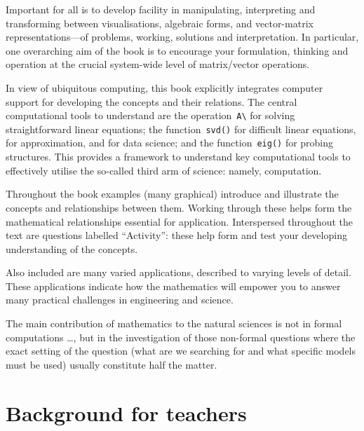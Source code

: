 Important for all is to develop facility in manipulating, interpreting and transforming between visualisations, algebraic forms, and vector-matrix representations---of problems, working, solutions and interpretation.
In particular, one overarching aim of the book is to encourage your formulation, thinking and operation at the crucial system-wide level of matrix\slash vector operations.

In view of ubiquitous computing, this book explicitly integrates computer support for developing the concepts and their relations.
The central computational tools to understand are the operation~\verb|A\| for solving straightforward linear equations; the function~\verb|svd()| for difficult linear equations, for approximation, and for data science; and the function~\verb|eig()| for probing structures.
This provides a framework to understand key computational tools to effectively utilise the so-called third arm of science: namely, computation. 

Throughout the book examples (many graphical) introduce and illustrate the concepts and relationships between them.
Working through these helps form the mathematical relationships essential for application.
Interspersed throughout the text are questions labelled ``Activity'': these help form and test your developing understanding of the concepts.

Also included are many varied applications, described to varying levels of detail.
These applications indicate how the mathematics will empower you to answer many practical challenges in engineering and science.


\begin{quoted}{\cite{Arnold2014}}%
The main contribution of mathematics to the natural sciences is not in formal computations \ldots, but in the investigation of those non-formal questions where the exact setting of the question (what are we searching for and what specific models must be used) usually constitute half the matter.
%
\end{quoted}








\section*{Background for teachers}

